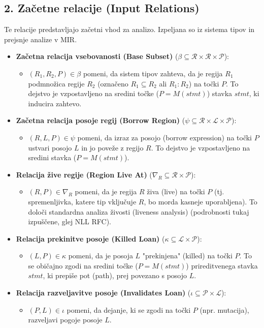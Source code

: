 \documentclass{article}
\begin{document}
\subsection*{2. Začetne relacije (Input Relations)}
Te relacije predstavljajo začetni vhod za analizo. Izpeljana so iz sistema tipov in prejsnje analize v MIR.
\begin{itemize}
	\item \textbf{Začetna relacija vsebovanosti (Base Subset)} ($\beta \subseteq \mathcal{R} \times \mathcal{R} \times \mathcal{P}$):
	      \begin{itemize}
		      \item $(R_1, R_2, P) \in \beta$ pomeni, da sistem tipov zahteva, da je regija $R_1$ podmnožica regije $R_2$ (označeno $R_1 \subseteq R_2$ ali $R_1 : R_2$) na točki $P$. To dejstvo je vzpostavljeno na sredini točke ($P = M(stmt)$) stavka $stmt$, ki inducira zahtevo.
	      \end{itemize}

	\item \textbf{Začetna relacija posoje regij (Borrow Region)} ($\psi \subseteq \mathcal{R} \times \mathcal{L} \times \mathcal{P}$):
	      \begin{itemize}
		      \item $(R, L, P) \in \psi$ pomeni, da izraz za posojo (borrow expression) na točki $P$ ustvari posojo $L$ in jo poveže z regijo $R$. To dejstvo je vzpostavljeno na sredini stavka ($P = M(stmt)$).
	      \end{itemize}

	\item \textbf{Relacija žive regije (Region Live At)} ($\nabla_{R} \subseteq \mathcal{R} \times \mathcal{P}$):
	      \begin{itemize}
		      \item $(R, P) \in \nabla_{R}$ pomeni, da je regija $R$ živa (live) na točki $P$ (tj. spremenljivka, katere tip vključuje $R$, bo morda kasneje uporabljena). To določi standardna analiza živosti (liveness analysis) (podrobnosti tukaj izpuščene, glej NLL RFC).
	      \end{itemize}

	\item \textbf{Relacija prekinitve posoje (Killed Loan)} ($\kappa \subseteq \mathcal{L} \times \mathcal{P}$):
	      \begin{itemize}
		      \item $(L, P) \in \kappa$ pomeni, da je posoja $L$ "prekinjena" (killed) na točki $P$. To se običajno zgodi na sredini točke ($P = M(stmt)$) prireditvenega stavka $stmt$, ki prepiše pot (path), prej povezano s posojo $L$.
	      \end{itemize}

	\item \textbf{Relacija razveljavitve posoje (Invalidates Loan)} ($\iota \subseteq \mathcal{P} \times \mathcal{L}$):
	      \begin{itemize}
		      \item $(P, L) \in \iota$ pomeni, da dejanje, ki se zgodi na točki $P$ (npr. mutacija), razveljavi pogoje posoje $L$.
	      \end{itemize}
\end{itemize}
\end{document}
